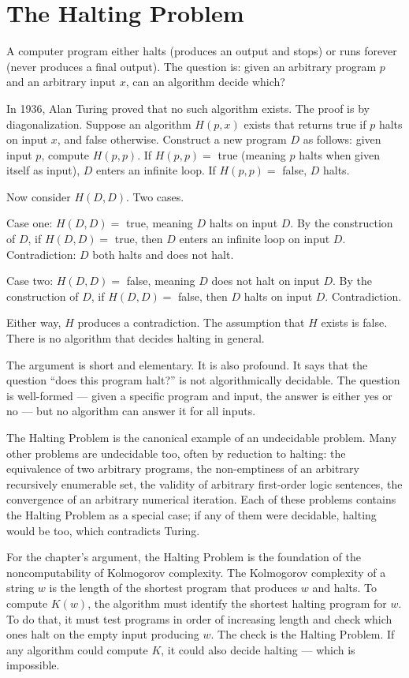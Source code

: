 \section{The Halting Problem}
\label{se:the-halting-problem}

A computer program either halts (produces an output and stops) or runs
forever (never produces a final output). The question is: given an
arbitrary program $p$ and an arbitrary input $x$, can an algorithm
decide which?

In 1936, Alan Turing proved that no such algorithm exists. The proof
is by diagonalization. Suppose an algorithm $H(p, x)$ exists that
returns true if $p$ halts on input $x$, and false otherwise. Construct
a new program $D$ as follows: given input $p$, compute $H(p, p)$. If
$H(p, p) = $ true (meaning $p$ halts when given itself as input), $D$
enters an infinite loop. If $H(p, p) = $ false, $D$ halts.

Now consider $H(D, D)$. Two cases.

Case one: $H(D, D) = $ true, meaning $D$ halts on input $D$. By the
construction of $D$, if $H(D, D) = $ true, then $D$ enters an infinite
loop on input $D$. Contradiction: $D$ both halts and does not halt.

Case two: $H(D, D) = $ false, meaning $D$ does not halt on input $D$.
By the construction of $D$, if $H(D, D) = $ false, then $D$ halts on
input $D$. Contradiction.

Either way, $H$ produces a contradiction. The assumption that $H$
exists is false. There is no algorithm that decides halting in
general.

The argument is short and elementary. It is also profound. It says
that the question ``does this program halt?'' is not algorithmically
decidable. The question is well-formed --- given a specific program
and input, the answer is either yes or no --- but no algorithm can
answer it for all inputs.

The Halting Problem is the canonical example of an undecidable
problem. Many other problems are undecidable too, often by reduction
to halting: the equivalence of two arbitrary programs, the
non-emptiness of an arbitrary recursively enumerable set, the
validity of arbitrary first-order logic sentences, the convergence
of an arbitrary numerical iteration. Each of these problems contains
the Halting Problem as a special case; if any of them were
decidable, halting would be too, which contradicts Turing.

For the chapter's argument, the Halting Problem is the foundation of
the noncomputability of Kolmogorov complexity. The Kolmogorov
complexity of a string $w$ is the length of the shortest program that
produces $w$ and halts. To compute $K(w)$, the algorithm must
identify the shortest halting program for $w$. To do that, it must
test programs in order of increasing length and check which ones
halt on the empty input producing $w$. The check is the Halting
Problem. If any algorithm could compute $K$, it could also decide
halting --- which is impossible.

